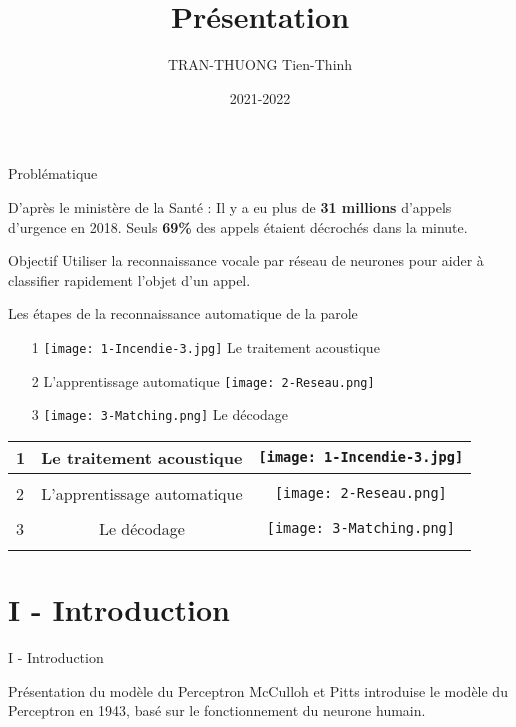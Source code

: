 \documentclass[10pt]{beamer}
\author{TRAN-THUONG Tien-Thinh}
\date{2021-2022}
\title{Présentation}
\begin{document}
\begin{frame}
\titlepage
\end{frame}

\begin{frame}{Problématique}
\begin{alert}{D'après le ministère de la Santé : }
Il y a eu plus de \textbf{31 millions} d'appels d'urgence en 2018. Seuls \textbf{69\%} des appels étaient décrochés dans la minute.
\end{alert}
\begin{block}{Objectif}
Utiliser la reconnaissance vocale par réseau de neurones pour aider à classifier rapidement l'objet d'un appel.
\end{block}
\end{frame}


\begin{frame}{Les étapes de la reconnaissance automatique de la parole}

\begin{itemize}
	\item[1] \texttt{[image: 1-Incendie-3.jpg]} Le traitement acoustique 
	\item[2] L'apprentissage automatique \texttt{[image: 2-Reseau.png]}
	\item[3] \texttt{[image: 3-Matching.png]} Le décodage
\end{itemize}
\end{frame}

\begin{frame}
\begin{tabular}{ l || c | c | }
   1 & Le traitement acoustique  & \texttt{[image: 1-Incendie-3.jpg]} \\ \hline \\
   2 & L'apprentissage automatique & \texttt{[image: 2-Reseau.png]} \\ \hline \\
   3 & Le décodage & \texttt{[image: 3-Matching.png]} \\ \hline \\

\end{tabular}
\end{frame}

\section{I - Introduction}
\begin{frame}{I - Introduction}
\begin{block}{Présentation du modèle du Perceptron}
McCulloh et Pitts introduise le modèle du Perceptron en 1943, basé sur le fonctionnement du neurone humain.
\end{block}
\end{frame}
\end{document}
